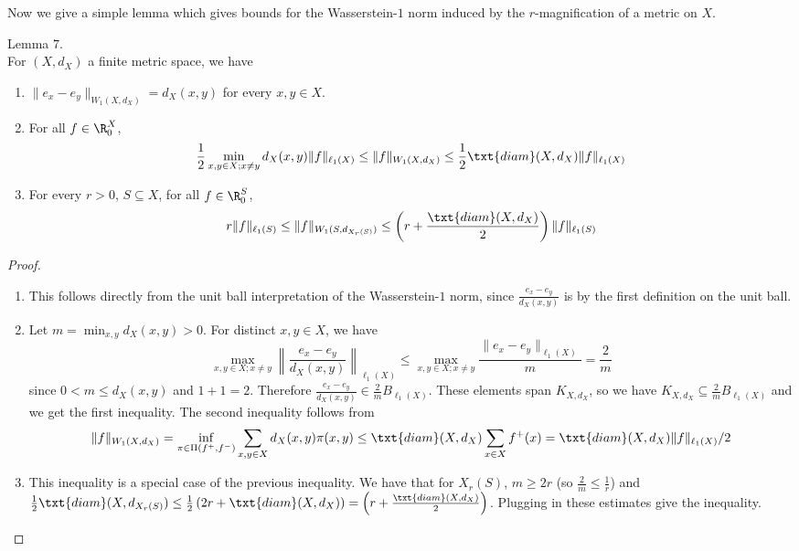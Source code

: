 Now we give a simple lemma which gives bounds for the Wasserstein-$1$ norm induced by the $r$-magnification of a metric on $X$.
\begin{lem} Lemma $7$. \\
For $(X, d_X)$ a finite metric space, we have
\begin{enumerate}

\item $\|e_x - e_y\|_{W_1(X, d_X)} = d_X(x, y)$ for every $x, y \in X$. 

\item For all $f \in \R_0^X$, 
\[
\frac{1}{2}\min_{x, y \in X; x \neq y} d_X(x, y)\|f\|_{\ell_1(X)} \leq \|f\|_{W_1(X, d_X)} \leq \frac{1}{2}\txt{diam}(X, d_X)\|f\|_{\ell_1(X)}
\]

\item For every $r > 0$, $S \subseteq X$, for all $f \in \R_0^S$,
\[
r\|f\|_{\ell_1(S)} \leq \|f\|_{W_1(S, d_{X_r(S)})} \leq \left(r + \frac{\txt{diam}(X, d_X)}{2}\right)\|f\|_{\ell_1(S)}
\]
\end{enumerate}
\end{lem}
\begin{proof}

\begin{enumerate}

\item This follows directly from the unit ball interpretation of the Wasserstein-$1$ norm, since $\frac{e_x - e_y}{d_X(x, y)}$ is by the first definition on the unit ball.

\item Let $m = \min_{x, y} d_X(x, y) > 0$. For distinct $x, y \in X$, we have
\[
\max_{x, y \in X; x \neq y}\left\|\frac{e_x - e_y}{d_X(x, y)} \right\|_{\ell_1(X)} \leq \max_{x, y \in X; x \neq y} \frac{\|e_x - e_y\|_{\ell_1(X)}}{m} = \frac{2}{m}
\]
since $0 < m \leq d_X(x, y)$ and $1 + 1 = 2$. Therefore $\frac{e_x - e_y}{d_X(x, y)} \in \frac{2}{m}B_{\ell_1(X)}$. These elements span $K_{X, d_X}$, so we have $K_{X, d_X} \subseteq \frac{2}{m}B_{\ell_1(X)}$ and we get the first inequality. 
The second inequality follows from 
\[
\|f\|_{W_1(X, d_X)} = \inf_{\pi \in \Pi(f^+, f^-)} \sum_{x, y \in X} d_X(x, y) \pi(x, y) \leq \txt{diam}(X, d_X)\sum_{x \in X} f^{+}(x) = \txt{diam}(X, d_X)\|f\|_{\ell_1(X)}/2
\]

\item This inequality is a special case of the previous inequality. We have that for $X_r(S)$, $m \geq 2r$ (so $\frac{2}{m} \leq \frac{1}{r}$) and $\frac{1}{2}\txt{diam}(X, d_{X_r(S)}) \leq \frac{1}{2}\left(2r  + \txt{diam}(X, d_X)\right) = \left(r + \frac{\txt{diam}(X, d_X)}{2}\right)$. Plugging in these estimates give the inequality.

\end{enumerate}
\end{proof}

